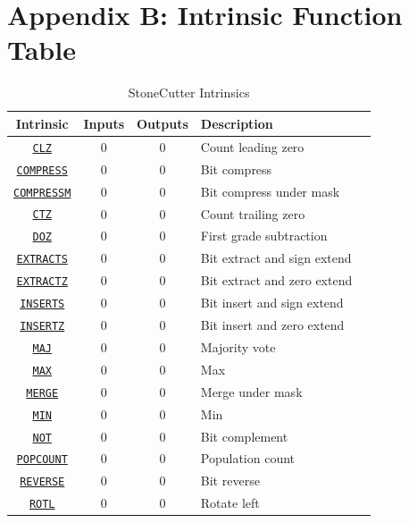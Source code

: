 \documentclass{article}
\begin{document}
\section{Appendix B: Intrinsic Function Table}
\label{sec:AppendixB}

\begin{table}[h]
\begin{center}
\caption{StoneCutter Intrinsics}
\vspace{0.125in}
\label{tab:scintrins}
\begin{tabular}{|c|c|c|l|l}
\hline
\textbf{Intrinsic} & \textbf{Inputs} & \textbf{Outputs} & \textbf{Description}\\
\hline
\hyperref[sec:CLZ]{\texttt{CLZ}} & 0 & 0 & Count leading zero\\
\hline
\hyperref[sec:COMPRESS]{\texttt{COMPRESS}} & 0 & 0 & Bit compress\\
\hline
\hyperref[sec:COMPRESSM]{\texttt{COMPRESSM}} & 0 & 0 & Bit compress under mask\\
\hline
\hyperref[sec:CTZ]{\texttt{CTZ}} & 0 & 0 & Count trailing zero\\
\hline
\hyperref[sec:DOZ]{\texttt{DOZ}} & 0 & 0 & First grade subtraction\\
\hline
\hyperref[sec:EXTRACTS]{\texttt{EXTRACTS}} & 0 & 0 & Bit extract and sign extend\\
\hline
\hyperref[sec:EXTRACTZ]{\texttt{EXTRACTZ}} & 0 & 0 & Bit extract and zero extend\\
\hline
\hyperref[sec:INSERTS]{\texttt{INSERTS}} & 0 & 0 & Bit insert and sign extend\\
\hline
\hyperref[sec:INSERTZ]{\texttt{INSERTZ}} & 0 & 0 & Bit insert and zero extend\\
\hline
\hyperref[sec:MAJ]{\texttt{MAJ}} & 0 & 0 & Majority vote\\
\hline
\hyperref[sec:MAX]{\texttt{MAX}} & 0 & 0 & Max\\
\hline
\hyperref[sec:MERGE]{\texttt{MERGE}} & 0 & 0 & Merge under mask\\
\hline
\hyperref[sec:MIN]{\texttt{MIN}} & 0 & 0 & Min\\
\hline
\hyperref[sec:NOT]{\texttt{NOT}} & 0 & 0 & Bit complement\\
\hline
\hyperref[sec:POPCOUNT]{\texttt{POPCOUNT}} & 0 & 0 & Population count\\
\hline
\hyperref[sec:REVERSE]{\texttt{REVERSE}} & 0 & 0 & Bit reverse\\
\hline
\hyperref[sec:ROTL]{\texttt{ROTL}} & 0 & 0 & Rotate left\\

\end{tabular}
\end{center}
\end{table}
\end{document}
